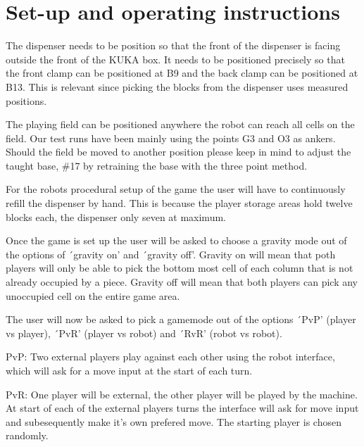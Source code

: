 \documentclass{article}
\begin{document}
    \makeHeader\newpage
    \tableofcontents
    \newpage
    \section{Set-up and operating instructions}
        The dispenser needs to be position so that the front of the dispenser is facing outside the front of the KUKA box. It needs to be positioned precisely so that the front clamp can be positioned at B9 and the back clamp can be positioned at B13. This is relevant since picking the blocks from the dispenser uses measured positions.
        
        The playing field can be positioned anywhere the robot can reach all cells on the field. Our test runs have been mainly using the points G3 and O3 as ankers. Should the field be moved to another position please keep in mind to adjust the taught base, \#17 by retraining the base with the three point method. 

        For the robots procedural setup of the game the user will have to continuously refill the dispenser by hand. This is because the player storage areas hold twelve blocks each, the dispenser only seven at maximum.

        Once the game is set up the user will be asked to choose a gravity mode out of the options of ´gravity on' and ´gravity off'. Gravity on will mean that poth players will only be able to pick the bottom most cell of each column that is not already occupied by a piece. Gravity off will mean that both players can pick any unoccupied cell on the entire game area.

        The user will now be asked to pick a gamemode out of the options ´PvP' (player vs player), ´PvR' (player vs robot) and ´RvR' (robot vs robot). 
        
        PvP\@: Two external players play against each other using the robot interface, which will ask for a move input at the start of each turn. 
        
        PvR\@: One player will be external, the other player will be played by the machine. At start of each of the external players turns the interface will ask for move input and subesequently make it's own prefered move. The starting player is chosen randomly. 
\end{document}
